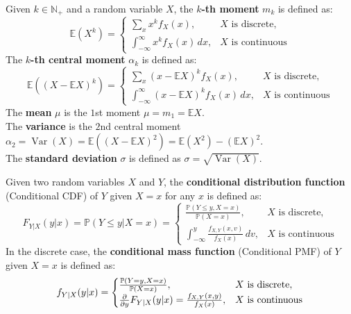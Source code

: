\documentclass{huhtakm-template-book-v2}
\newcommand{\prob}{\mathbb{P}}
\newcommand{\expect}{\mathbb{E}}
\DeclareMathOperator{\Var}{Var}
\begin{document}
    \begin{sdefn}
        Given $k \in \mathbb{N}_{+}$ and a random variable $X$, the \textbf{$k$-th moment} $m_{k}$ is defined as:
        \begin{equation*}
            \expect(X^{k}) = \begin{cases}
                \sum_{x}x^{k}f_{X}(x), & X \text{ is discrete},\\
                \int_{-\infty}^{\infty} x^{k}f_{X}(x)\,dx, & X \text{ is continuous}
            \end{cases}
        \end{equation*}
        The \textbf{$k$-th central moment} $\alpha_{k}$ is defined as:
        \begin{equation*}
            \expect((X - \expect{X})^{k}) = \begin{cases}
                \sum_{x}(x - \expect{X})^{k}f_{X}(x), & X \text{ is discrete},\\
                \int_{-\infty}^{\infty}(x - \expect{X})^{k}f_{X}(x)\,dx, & X \text{ is continuous}
            \end{cases}
        \end{equation*}
        The \textbf{mean} $\mu$ is the $1$st moment $\mu = m_{1} = \expect{X}$.\\
        The \textbf{variance} is the $2$nd central moment $\alpha_{2} = \Var(X) = \expect((X - \expect{X})^{2}) = \expect(X^{2}) - (\expect{X})^{2}$.\\
        The \textbf{standard deviation} $\sigma$ is defined as $\sigma = \sqrt{\Var(X)}$.
    \end{sdefn}
    \begin{sdefn}
        Given two random variables $X$ and $Y$, the \textbf{conditional distribution function} (Conditional CDF) of $Y$ given $X = x$ for any $x$ is defined as:
        \begin{equation*}
            F_{Y|X}(y|x) = \prob(Y \leq y | X = x) = \begin{cases}
                \frac{\prob(Y \leq y, X = x)}{\prob(X = x)}, & X \text{ is discrete},\\
                \int_{-\infty}^{y}\frac{f_{X,Y}(x, v)}{f_{X}(x)}\,dv, & X \text{ is continuous}
            \end{cases}
        \end{equation*}
        In the discrete case, the \textbf{conditional mass function} (Conditional PMF) of $Y$ given $X = x$ is defined as:
        \begin{equation*}
            f_{Y|X}(y|x) = \begin{cases}
                \frac{\prob(Y = y, X = x)}{\prob(X = x)}, & X \text{ is discrete},\\
                \pdv*{F_{Y|X}(y|x)}{y} = \frac{f_{X,Y}(x, y)}{f_{X}(x)}, & X \text{ is continuous}
            \end{cases}
        \end{equation*}
    \end{sdefn}
\end{document}

